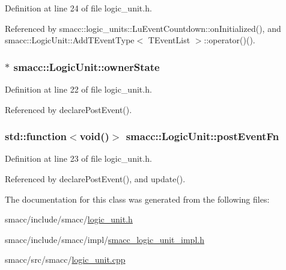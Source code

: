 Definition at line 24 of file logic\+\_\+unit.\+h.



Referenced by smacc\+::logic\+\_\+units\+::\+Lu\+Event\+Countdown\+::on\+Initialized(), and smacc\+::\+Logic\+Unit\+::\+Add\+T\+Event\+Type$<$ T\+Event\+List $>$\+::operator()().

\subsubsection[{\texorpdfstring{owner\+State}{ownerState}}]{$\ast$ smacc\+::\+Logic\+Unit\+::owner\+State}\hypertarget{classsmacc_1_1LogicUnit_a8863d227f46868876632b07b500f27d6}{}\label{classsmacc_1_1LogicUnit_a8863d227f46868876632b07b500f27d6}


Definition at line 22 of file logic\+\_\+unit.\+h.



Referenced by declare\+Post\+Event().

\subsubsection[{\texorpdfstring{post\+Event\+Fn}{postEventFn}}]{\setlength{\rightskip}{0pt plus 5cm}std\+::function$<$void()$>$ smacc\+::\+Logic\+Unit\+::post\+Event\+Fn}\hypertarget{classsmacc_1_1LogicUnit_ac75aaeeea0e8d3667763a332ecfd65f7}{}\label{classsmacc_1_1LogicUnit_ac75aaeeea0e8d3667763a332ecfd65f7}


Definition at line 23 of file logic\+\_\+unit.\+h.



Referenced by declare\+Post\+Event(), and update().



The documentation for this class was generated from the following files\+:\begin{DoxyCompactItemize}
\item 
smacc/include/smacc/\hyperlink{logic__unit_8h}{logic\+\_\+unit.\+h}\item 
smacc/include/smacc/impl/\hyperlink{smacc__logic__unit__impl_8h}{smacc\+\_\+logic\+\_\+unit\+\_\+impl.\+h}\item 
smacc/src/smacc/\hyperlink{logic__unit_8cpp}{logic\+\_\+unit.\+cpp}\end{DoxyCompactItemize}

